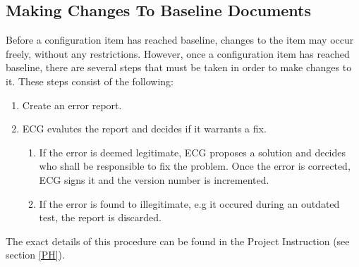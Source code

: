 \documentclass{article}
\begin{document}
        \subsection{Making Changes To Baseline Documents}
        Before a configuration item has reached baseline, changes to the item
        may occur freely, without any restrictions.
        However, once a configuration item has reached baseline, there are several steps
        that must be taken in order to make changes to it.
        These steps consist of the following:
        \begin{enumerate}
            \item Create an error report.
            \item ECG evalutes the report and decides if it warrants a fix.
                \begin{enumerate}
                    \item If the error is deemed legitimate, ECG proposes a solution and decides who shall be responsible to fix the problem. Once the error is corrected, ECG signs it and the version number is incremented.
                    \item If the error is found to illegitimate, e.g it occured during an outdated test, the report is discarded.
                \end{enumerate}
        \end{enumerate}
        The exact details of this procedure can be found in the Project Instruction (see section \ref{PH}).
\end{document}
